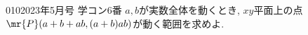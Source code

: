 \begin{prob}{010}{}{2023年5月号 学コン6番}
 $a,b$が実数全体を動くとき, $xy$平面上の点$\mr{P}(a+b+ab, (a+b)ab)$が動く範囲を求めよ.
\end{prob}
